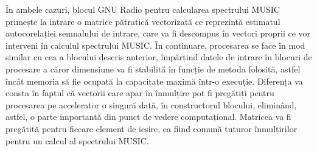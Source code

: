 În ambele cazuri, blocul GNU Radio pentru calcularea spectrului MUSIC primește
la intrare o matrice pătratică vectorizată ce reprezintă estimatul
autocorelației semnalului de intrare, care va fi descompus în vectori proprii ce
vor interveni în calculul spectrului MUSIC. În continuare, procesarea se face în
mod similar cu cea a blocului descris anterior, împărțind datele de intrare în
blocuri de procesare a căror dimensiune va fi stabilită în funcție de metoda
folosită, astfel încât memoria să fie ocupată la capacitate maximă într-o
execuție. Diferența va consta în faptul că vectorii care apar în înmulțire pot
fi pregătiți pentru procesarea pe accelerator o singură dată, în constructorul
blocului, eliminând, astfel, o parte importantă din punct de vedere
computațional. Matricea va fi pregătită pentru fiecare element de ieșire, ea
fiind comună tuturor înmulțirilor pentru un calcul al spectrului MUSIC. \\


